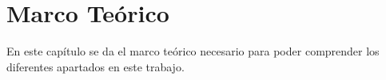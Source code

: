 \chapter{Marco Teórico}
En este capítulo se da el marco teórico necesario para poder comprender los diferentes apartados en este trabajo.